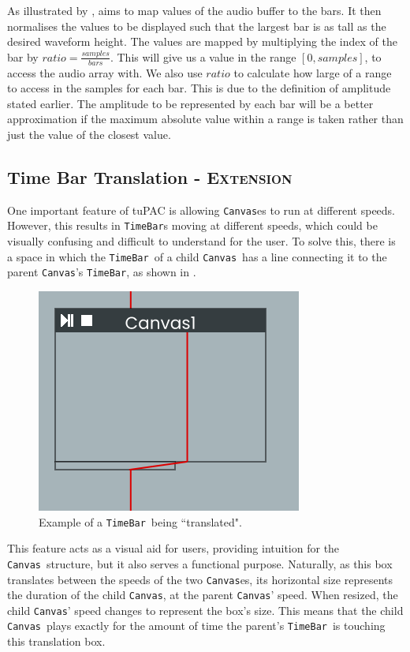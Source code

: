 \documentclass[12pt,a4paper,oneside,openright]{report}
\newcommand{\canvas}{\texttt{Canvas}}
\newcommand{\timebar}{\texttt{TimeBar}}
\begin{document}
As illustrated by ,  aims to map values of the audio buffer to the bars. It then normalises the values to be displayed such that the largest bar is as tall as the desired waveform height. The values are mapped by multiplying the index of the bar by $ratio = \frac{samples}{bars}$. This will give us a value in the range $[0,samples]$, to access the audio array with. We also use $ratio$ to calculate how large of a range to access in the samples for each bar. This is due to the definition of amplitude stated earlier. The amplitude to be represented by each bar will be a better approximation if the maximum absolute value within a range is taken rather than just the value of the closest value.

\subsection{Time Bar Translation - \textsc{Extension}}\label{sec:timebar_translate}
One important feature of tuPAC is allowing \canvas es to run at different speeds. However, this results in \timebar s moving at different speeds, which could be visually confusing and difficult to understand for the user. To solve this, there is a space in which the \timebar\ of a child \canvas\ has a line connecting it to the parent \canvas's \timebar, as shown in .

\begin{figure}[h!]
    \centering
    \includegraphics{images/timebartranslate.png}
    \caption{Example of a \timebar\ being ``translated".}
    \label{fig:timebartranslation}
\end{figure}

This feature acts as a visual aid for users, providing intuition for the \canvas\ structure, but it also serves a functional purpose. Naturally, as this box translates between the speeds of the two \canvas es, its horizontal size represents the duration of the child \canvas, at the parent \canvas' speed. When resized, the child \canvas' speed changes to represent the box's size. This means that the child \canvas\ plays exactly for the amount of time the parent's \timebar\ is touching this translation box.
\end{document}
